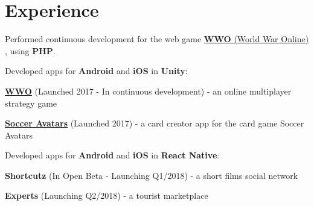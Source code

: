\documentclass[a4paper]{deedy-resume} %
\begin{document}
\hfill
%
%
\begin{minipage}[t]{0.64\textwidth} %


\section{Experience}

\href{https://www.chilltime.com/}{}
\begin{tightitemize}
    \vspace{\topsep}
    \item Performed continuous development for the web game \href{https://www.worldwaronline.com/}{\textbf{WWO} (World War Online)} , using \textbf{PHP}.
    \item Developed apps for \textbf{Android} and \textbf{iOS} in \textbf{Unity}:
    \begin{innertightitemize}
        \item \href{https://www.worldwaronline.com/}{\textbf{WWO}} (Launched 2017 - In continuous development) - an online multiplayer strategy game
        \item \href{https://www.socceravatars.com/}{\textbf{Soccer Avatars}} (Launched 2017) - a card creator app for the card game Soccer Avatars
    \end{innertightitemize}
    \item Developed apps for \textbf{Android} and \textbf{iOS} in \textbf{React Native}:
    \begin{innertightitemize}
        \item \textbf{Shortcutz} (In Open Beta - Launching Q1/2018) - a short films social network
        \item \textbf{Experts} (Launching Q2/2018) - a tourist marketplace
    \end{innertightitemize}
\end{tightitemize}

\sectionspace %



\end{minipage}
\end{document}
